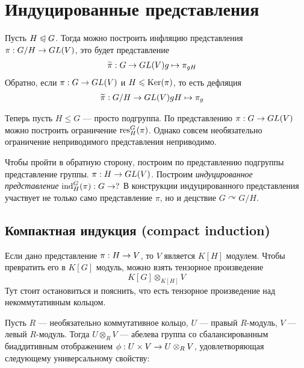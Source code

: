 

\section{Индуцированные представления}
Пусть $H \trianglelefteqslant G$.
Тогда можно построить инфляцию представления $\pi: G/H \rightarrow GL(V)$, это будет представление \begin{align*}
                                                                                                \widetilde{\pi}: G &\rightarrow GL(V)g \mapsto \pi_{gH}
\end{align*}
Обратно, если $\pi: G \rightarrow GL(V)$ и $H \leqslant \operatorname{Ker}(\pi)$, то есть дефляция \begin{align*}
                                                                            \widetilde{\pi}: G/H &\rightarrow GL(V)gH \mapsto \pi_{g}
\end{align*}

Теперь пусть $H \le G$ --- просто подгруппа.
По представлению $\pi: G \rightarrow GL(V)$ можно построить ограничение $\operatorname{res}^G_H(\pi)$.
Однако совсем необязательно ограничение неприводимого представления неприводимо.

Чтобы пройти в обратную сторону, построим по представлению подгруппы представление группы. $\pi: H \rightarrow GL(V)$.
Построим \textit{индуцированное представление} $\operatorname{ind}_H^G(\pi): G \rightarrow ?$
В конструкции индуцированного представления участвует не только само представление $\pi$, но и децствие $G \curvearrowright G/H$.

\subsection{Компактная индукция (compact induction)}
Если дано представление $\pi: H \rightarrow V$, то $V$ является $K[H]$ модулем.
Чтобы превратить его в $K[G]$ модуль, можно взять тензорное произведение
\[K[G] \otimes_{K[H]} V\]
Тут стоит остановиться и пояснить, что есть тензорное произведение над некоммутативным кольцом.

Пусть $R$ --- необязательно коммутативное кольцо, $U$ --- правый $R$-модуль, $V$ --- левый $R$-модуль.
Тогда $U \otimes_R V$ --- абелева группа со сбалансированным биаддитивным отображением $\phi: U \times V \rightarrow U \otimes_R V$, удовлетворяющая следующему универсальному свойству:

